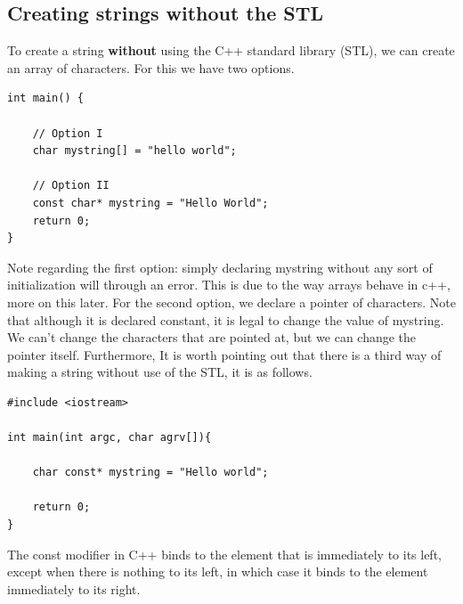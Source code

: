\documentclass{report}
\begin{document}
    \pagebreak \bigbreak \noindent 
    \subsection{Creating strings without the STL}
    To create a string \textbf{without} using the C++ standard library (STL), we can create an array of characters. For this we have two options.
    \bigbreak \noindent 
    \sepline
    \begin{verbatim}
int main() {

    // Option I
    char mystring[] = "hello world";

    // Option II
    const char* mystring = "Hello World";
    return 0;
}
    \end{verbatim}
    \sepline
    \bigbreak \noindent 
    Note regarding the first option: simply declaring mystring without any sort of initialization will through an error. This is due to the way arrays behave in c++, more on this later.
    \bigbreak \noindent 
    For the second option, we declare a pointer of characters. Note that although it is declared constant, it is legal to change the value of mystring. We can't change the characters that are pointed at, but we can change the pointer itself.
    \bigbreak \noindent 
    Furthermore, It is worth pointing out that there is a third way of making a string without use of the STL, it is as follows.
    \bigbreak \noindent 
    \sepline
    \begin{verbatim}
#include <iostream>

int main(int argc, char agrv[]){

    char const* mystring = "Hello world";

    return 0;
}
    \end{verbatim}
    \sepline
    \bigbreak \noindent 
    The const modifier in C++ binds to the element that is immediately to its left, except when there is nothing to its left, in which case it binds to the element immediately to its right.
    \bigbreak \noindent 
\end{document}
